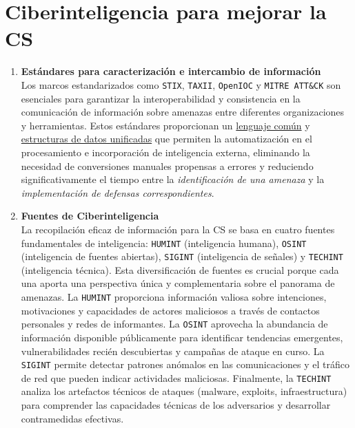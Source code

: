 \section{Ciberinteligencia para mejorar la CS}
\begin{enumerate}[resume]  %

\item \textbf{Estándares para caracterización e intercambio de información} \\
Los marcos estandarizados como \texttt{STIX}, \texttt{TAXII}, \texttt{OpenIOC} y \texttt{MITRE ATT\&CK} son esenciales para garantizar la interoperabilidad y consistencia en la comunicación de información sobre amenazas entre diferentes organizaciones y herramientas. Estos estándares proporcionan un \ul{lenguaje común} y \ul{estructuras de datos unificadas} que permiten la automatización en el procesamiento e incorporación de inteligencia externa, eliminando la necesidad de conversiones manuales propensas a errores y reduciendo significativamente el tiempo entre la \textit{identificación de una amenaza} y la \textit{implementación de defensas correspondientes}.

\item \textbf{Fuentes de Ciberinteligencia} \\
La recopilación eficaz de información para la CS se basa en cuatro fuentes fundamentales de inteligencia: \texttt{HUMINT} (inteligencia humana), \texttt{OSINT} (inteligencia de fuentes abiertas), \texttt{SIGINT} (inteligencia de señales) y \texttt{TECHINT} (inteligencia técnica). Esta diversificación de fuentes es crucial porque cada una aporta una perspectiva única y complementaria sobre el panorama de amenazas. La \texttt{HUMINT} proporciona información valiosa sobre intenciones, motivaciones y capacidades de actores maliciosos a través de contactos personales y redes de informantes. La \texttt{OSINT} aprovecha la abundancia de información disponible públicamente para identificar tendencias emergentes, vulnerabilidades recién descubiertas y campañas de ataque en curso. La \texttt{SIGINT} permite detectar patrones anómalos en las comunicaciones y el tráfico de red que pueden indicar actividades maliciosas. Finalmente, la \texttt{TECHINT} analiza los artefactos técnicos de ataques (malware, exploits, infraestructura) para comprender las capacidades técnicas de los adversarios y desarrollar contramedidas efectivas.


\end{enumerate}
